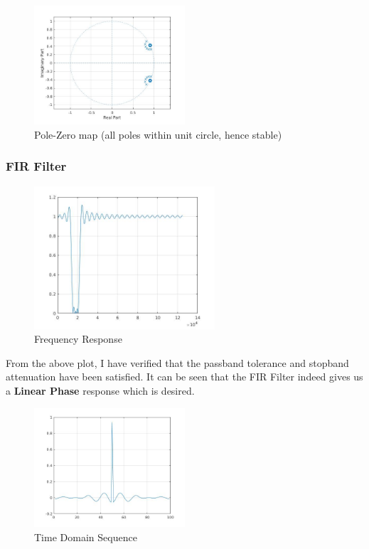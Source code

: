 \documentclass[12pt]{article}
\begin{document}
\begin{figure}[h!]
	\centering	
	\includegraphics[width = 0.5\textwidth]{2pz.jpg}
    \caption{Pole-Zero map (all poles within unit circle, hence stable)}
\end{figure}\newpage
\subsubsection{FIR Filter}
\begin{figure}[h!]
	\centering	
	\includegraphics[width = 0.6\textwidth]{2firm.jpg}
    \caption{Frequency Response}
\end{figure}
From the above plot, I have verified that the passband tolerance and stopband attenuation have been satisfied. It can be seen that the FIR Filter indeed gives us a \textbf{Linear Phase} response which is desired.
\begin{figure}[h!]
	\centering	
	\includegraphics[width = 0.5\textwidth]{2firc.jpg}
    \caption{Time Domain Sequence}
\end{figure}
\end{document}
